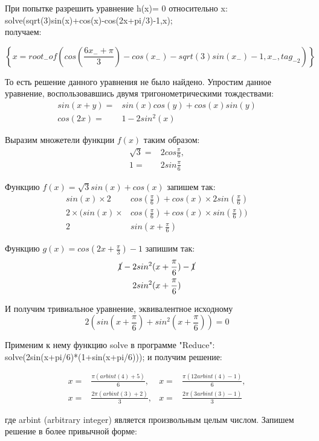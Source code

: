 \documentclass[russian,utf8,nocolumnxxxi,nocolumnxxxii]{eskdtext}
\begin{document}
При попытке разрешить уравнение h(x)= 0 относительно x:\\
solve(sqrt(3)sin(x)+cos(x)-cos(2x+pi/3)-1,x);\\
получаем:

$$
\left\{x=root_{-}of\left(cos\left(\frac{6x_{-}+\pi}{3}\right)-cos(x_{-})-sqrt(3)sin(x_{-})-1, x_{-}, tag_{-2}\right)\right\}
$$

То есть решение данного уравнения не было найдено.
Упростим данное уравнение, воспользовавшись двумя тригонометрическими тождествами: 
\begin{align}
sin(x+y)=& sin(x)cos(y)+cos(x)sin(y)\\
cos(2x)=&1-2sin^2(x) 
\end{align}

Выразим множетели функции $f(x)$ таким образом:
\begin{align*}
\sqrt3=&2 cos\frac{\pi}{6},\\   
1=&2 sin\frac{\pi}{6}
\end{align*}

Функцию $f(x)=\sqrt3 sin(x)+cos(x)$ запишем так:
\begin{align*}
sin(x) \times 2 &cos(\frac{\pi}{6})+cos(x) \times 2 sin(\frac{\pi}{6})\\
2\times(sin(x)\times &cos(\frac{\pi}{6})+cos(x) \times sin(\frac{\pi}{6}))\\
2& sin(x+\frac{\pi}{6})
\end{align*}

Функцию $g(x)=cos(2x+\frac{\pi}{3})-1$ запишим так:
\begin{align*}
\cancel{1}-2sin^2&(x+\frac{\pi}{6})-\cancel{1}\\
2sin^2&(x+\frac{\pi}{6})
\end{align*}



И получим тривиальное уравнение, эквивалентное исходному
$$2(sin(x+\frac{\pi}{6})+sin^2(x+\frac{\pi}{6}))=0$$

Применим к нему функцию solve в программе "Reduce":\\
solve(2sin(x+pi/6)*(1+sin(x+pi/6)));
и получим решение:

\begin{align*}
	x=&\frac{\pi(arbint(4)+5)}{6},& x=&\frac{\pi(12arbint(4)-1)}{6},\\ 
x=&\frac{2\pi(arbint(3)+2)}{3},& x=&\frac{2\pi(3arbint(3)-1)}{3} 
\end{align*}

где arbint (arbitrary integer) является произвольным целым числом. Запишем решение в более привычной форме:
\end{document}
